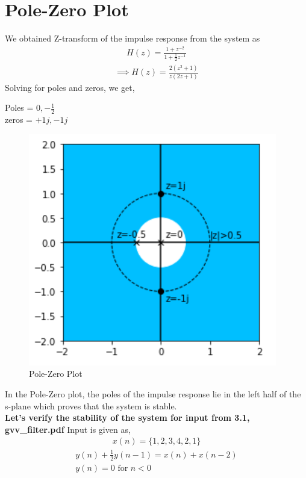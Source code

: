 \documentclass[journal,12pt,twocolumn]{IEEEtran}
\begin{document}
\section{Pole-Zero Plot}
 We obtained Z-transform of the impulse response from the system as
\begin{align}
    H(z) = \frac{1+z^{-2}}{1+\frac{1}{2}z^{-1}} 
\end{align}
\begin{align}
    \implies H(z) = \frac{2(z^2+1)}{z(2z+1)} 
\end{align}
Solving for poles and zeros, we get, 
\begin{center}
    Poles = $0 , -\frac{1}{2}$ \medskip \\
    zeros = $+1j, -1j$
\end{center}

\begin{figure}[h!]
    \centering
    \includegraphics[scale=0.42]{polezero.png}
    \caption{Pole-Zero Plot}
\end{figure}

In the Pole-Zero plot, the poles of the impulse response lie in the left half of the s-plane which proves that the system is stable.\\

\textbf{Let's verify the stability of the system for input from 3.1, gvv\_filter.pdf} 
\medskip
Input is given as,
\begin{align}
    x(n)=\{1,2,3,4,2,1\}
\end{align}
\begin{align}
    y(n)+\frac{1}{2}y(n-1) = x(n)+x(n-2) \\
    y(n)=0 \text{ for }n<0
\end{align}
\end{document}
